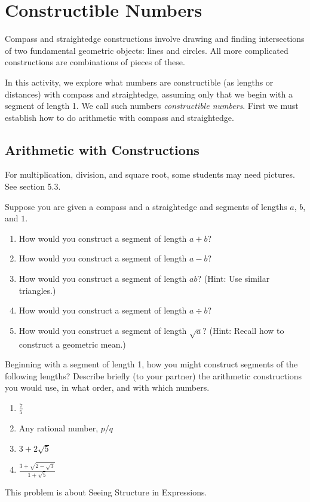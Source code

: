 \newpage
\section{Constructible Numbers}
Compass and straightedge constructions involve drawing and finding intersections of two fundamental geometric objects:  lines and circles.  All more complicated constructions are combinations of pieces of these.  

In this activity, we explore what numbers are constructible (as lengths or distances) with compass and straightedge, assuming only that we begin with a segment of length 1.  We call such numbers \textit{constructible numbers}.  First we must establish how to do arithmetic with compass and straightedge.  

\subsection*{Arithmetic with Constructions}
\begin{teachingnote}
For multiplication, division, and square root, some students may need pictures.  See section 5.3.
\end{teachingnote}
\begin{prob}
Suppose you are given a compass and a straightedge and segments of lengths $a$, $b$, and $1$.  
\begin{enumerate}
\item How would you construct a segment of length $a+b$? 
\item How would you construct a segment of length $a-b$? 
\item How would you construct a segment of length $ab$?  (Hint:  Use similar triangles.)  
\item How would you construct a segment of length $a\div b$? 
\item How would you construct a segment of length $\sqrt{a}$?  (Hint: Recall how to construct a geometric mean.)  
\end{enumerate}
\end{prob}

\begin{prob}
Beginning with a segment of length 1, how you might construct segments of the following lengths?  Describe briefly (to your partner) the arithmetic constructions you would use, in what order, and with which numbers.  
\begin{enumerate}
\item $\frac{7}{5}$
\item Any rational number, $p/q$
\item $3+2\sqrt{5}$
\item $\frac{3 + \sqrt{2-\sqrt{3}}}{1+\sqrt{5}}$
\end{enumerate}
\end{prob}
\begin{teachingnote}
This problem is about Seeing Structure in Expressions.
\end{teachingnote}

